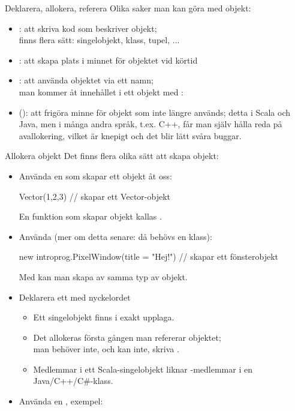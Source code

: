 \begin{Slide}{Deklarera, allokera, referera}
Olika saker man kan göra med objekt:
\begin{itemize}
  \item {}: att skriva kod som beskriver objekt; \\
  finns flera sätt: singelobjekt, klass, tupel, ...
  \item {}: att skapa plats i minnet för objektet vid körtid
  \item {}: att använda objektet via ett namn;\\
  man kommer åt innehållet i ett objekt med : \\
  \pause
  \item (): att frigöra minne för objekt som inte längre används;
  detta  i Scala och Java, men i många andra språk,
  t.ex. C++, får man själv hålla reda på avallokering,
  vilket är knepigt och det blir lätt svåra buggar.
\end{itemize}
\end{Slide}


\begin{Slide}{Allokera objekt}\SlideFontSmall
Det finns flera olika sätt att skapa objekt:
\begin{itemize}

\item Använda en  som skapar ett objekt åt oss:
\begin{Code}
Vector(1,2,3)   // skapar ett Vector-objekt
\end{Code}
{\SlideFontSmall En funktion som skapar objekt kallas .\vspace{0.5em}}

\item Använda  (mer om detta senare: då behövs en klass):
\begin{Code}
new introprog.PixelWindow(title = "Hej!")  // skapar ett fönsterobjekt
\end{Code}
{\SlideFontSmall Med  kan man skapa  av samma typ av objekt.\vspace{0.5em}}

\item Deklarera ett  med nyckelordet 
\begin{itemize}\SlideFontSmall
  \item Ett singelobjekt finns i exakt  upplaga.
  \item Det allokeras  första gången man refererar objektet; \\
  man behöver inte, och kan inte, skriva .
  \pause
  \item Medlemmar i ett Scala-singelobjekt liknar -medlemmar i en Java/C++/C\#-klass.
\end{itemize}
\item Använda en , exempel: 
\end{itemize}
\end{Slide}

